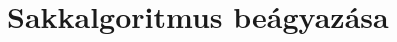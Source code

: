 \documentclass[../documentation.tex]{subfiles}
\begin{document}
\section{Sakkalgoritmus beágyazása}
\end{document}
